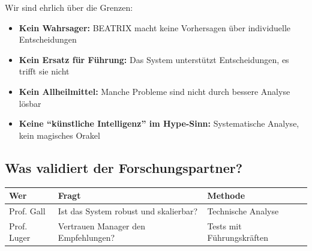 \documentclass[11pt,a4paper]{article}
\begin{document}
Wir sind ehrlich über die Grenzen:

\begin{itemize}
    \item \textbf{Kein Wahrsager:} BEATRIX macht keine Vorhersagen über individuelle Entscheidungen
    \item \textbf{Kein Ersatz für Führung:} Das System unterstützt Entscheidungen, es trifft sie nicht
    \item \textbf{Kein Allheilmittel:} Manche Probleme sind nicht durch bessere Analyse lösbar
    \item \textbf{Keine ``künstliche Intelligenz'' im Hype-Sinn:} Systematische Analyse, kein magisches Orakel
\end{itemize}

\subsection{Was validiert der Forschungspartner?}

\begin{table}[h]
\centering
\begin{tabular}{@{}L{3cm}L{5cm}L{5cm}@{}}
\toprule
\textbf{Wer} & \textbf{Fragt} & \textbf{Methode} \\
\midrule
Prof. Gall & Ist das System robust und skalierbar? & Technische Analyse \\
Prof. Luger & Vertrauen Manager den Empfehlungen? & Tests mit Führungskräften \\
\bottomrule
\end{tabular}
\end{table}

\vspace{1cm}
\end{document}
